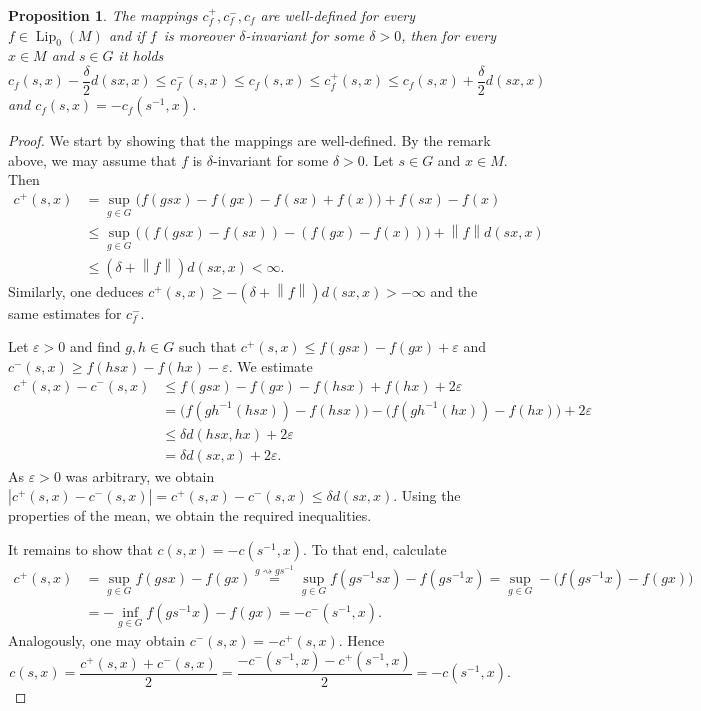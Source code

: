 \documentclass[11pt,a4paper]{amsart}
\newtheorem{proposition}[theorem]{Proposition}
\theoremstyle{definition}
\newcommand{\eps}{\varepsilon}
\newcommand{\abs}[1]{\left| #1 \right|}
\newcommand{\norm}[1]{\left\| #1 \right\|}
\newcommand{\eqNote}[1]{\stackrel{\text{#1}}{=}}
\newcommand{\Lipz}{\operatorname{Lip}_0}
\begin{document}
	\begin{proposition}\label{prop:meanProps}
		The mappings $c^+_f, c^-_f, c_f$ are well-defined for every $f \in \Lipz(M)$ and if $f$~is moreover $\delta$-invariant for some $\delta > 0$, then for every $x \in M$ and $s \in G$ it holds
		\begin{equation*}
			c_f(s, x) - \frac{\delta}{2} d(sx, x) \leq c^-_f(s, x) \leq c_f(s, x) \leq c^+_f(s, x) \leq c_f(s, x) + \frac{\delta}{2} d(sx, x)
		\end{equation*}
		and $c_f(s, x) = -c_f(s^{-1}, x)$.
	\end{proposition}
	\begin{proof}
		We start by showing that the mappings are well-defined. By the remark above, we may assume that $f$ is $\delta$-invariant for some $\delta > 0$. Let $s \in G$ and $x \in M$. Then
		\begin{align*}
			c^+(s, x)
			&= \sup\limits_{g \in G} \big(f(gsx) - f(gx) - f(sx) + f(x) \big) + f(sx) - f(x)\\
			&\leq \sup\limits_{g \in G} \big( (f(gsx) - f(sx)) - (f(gx) - f(x)) \big) + \norm{f}d(sx,x)\\
			&\leq  (\delta + \norm{f})d(sx,x) < \infty.
		\end{align*}
		Similarly, one deduces $c^+(s, x) \geq -(\delta + \norm{f})d(sx,x) > -\infty$ and the same estimates for $c^-_f$.

		Let $\eps > 0$ and find $g, h \in G$ such that $c^+(s, x) \leq f(gsx) - f(gx) + \eps$ and $c^-(s, x) \geq f(hsx) - f(hx) - \eps$. We estimate
		\begin{align*}
			c^+(s,x) - c^-(s,x)
			&\leq f(gsx) - f(gx) - f(hsx) + f(hx) + 2\eps\\
			&= \big( f(gh^{-1} (hsx)) - f(hsx) \big) - \big( f(gh^{-1} (hx)) - f(hx) \big) + 2\eps \\
			&\leq \delta d(hsx, hx) + 2\eps \\
			&= \delta d(sx, x) + 2\eps.
		\end{align*}
		As $\eps > 0$ was arbitrary, we obtain $\abs{c^+(s,x) - c^-(s,x)} = c^+(s,x) - c^-(s,x) \leq \delta d(sx, x)$. Using the properties of the mean, we obtain the required inequalities.
		
		It remains to show that $c(s, x) = -c(s^{-1}, x)$. To that end, calculate
		\begin{align*}
			c^+(s, x)
			&= \sup_{g \in G} f(gsx) - f(gx)
			\eqNote{$g \rightsquigarrow gs^{-1}$} \sup_{g \in G} f(gs^{-1}sx) - f(gs^{-1}x)
			= \sup_{g \in G} -\big(f(gs^{-1}x) - f(gx)\big)\\
			&= -\inf_{g \in G} f(gs^{-1}x) - f(gx)
			= -c^-(s^{-1}, x).
		\end{align*}
		Analogously, one may obtain $c^-(s, x) = -c^+(s, x)$. Hence
		\begin{equation*}
			c(s, x) = \frac{c^+(s, x) + c^-(s, x)}{2} = \frac{-c^-(s^{-1}, x) - c^+(s^{-1}, x)}{2} = -c(s^{-1}, x).
		\end{equation*}
	\end{proof}
	
\end{document}
